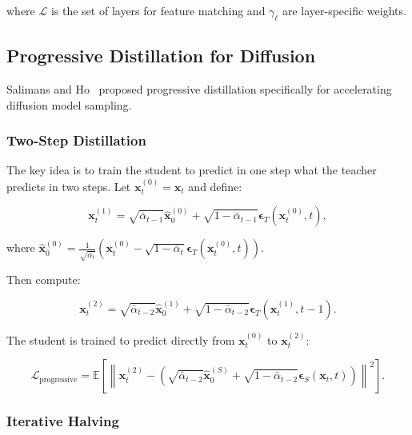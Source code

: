 \documentclass[12pt]{report}
\theoremstyle{definition}
\newcommand{\E}{\mathbb{E}}
\newcommand{\loss}{\mathcal{L}}
\newcommand{\norm}[1]{\left\| #1 \right\|}
\begin{document}
where $\mathcal{L}$ is the set of layers for feature matching and $\gamma_\ell$ are layer-specific weights.

\subsection{Progressive Distillation for Diffusion}

Salimans and Ho~\citep{salimans2022progressive} proposed progressive distillation specifically for accelerating diffusion model sampling.

\subsubsection{Two-Step Distillation}

The key idea is to train the student to predict in one step what the teacher predicts in two steps. Let $\mathbf{x}_t^{(0)} = \mathbf{x}_t$ and define:

\begin{equation}
\mathbf{x}_t^{(1)} = \sqrt{\bar{\alpha}_{t-1}}\hat{\mathbf{x}}_0^{(0)} + \sqrt{1 - \bar{\alpha}_{t-1}}\boldsymbol{\epsilon}_T(\mathbf{x}_t^{(0)}, t),
\label{eq:x_t_1}
\end{equation}

where $\hat{\mathbf{x}}_0^{(0)} = \frac{1}{\sqrt{\bar{\alpha}_t}}(\mathbf{x}_t^{(0)} - \sqrt{1-\bar{\alpha}_t}\boldsymbol{\epsilon}_T(\mathbf{x}_t^{(0)}, t))$.

Then compute:

\begin{equation}
\mathbf{x}_t^{(2)} = \sqrt{\bar{\alpha}_{t-2}}\hat{\mathbf{x}}_0^{(1)} + \sqrt{1 - \bar{\alpha}_{t-2}}\boldsymbol{\epsilon}_T(\mathbf{x}_t^{(1)}, t-1).
\label{eq:x_t_2}
\end{equation}

The student is trained to predict directly from $\mathbf{x}_t^{(0)}$ to $\mathbf{x}_t^{(2)}$:

\begin{equation}
\loss_{\text{progressive}} = \E\left[\norm{\mathbf{x}_t^{(2)} - \left(\sqrt{\bar{\alpha}_{t-2}}\hat{\mathbf{x}}_0^{(S)} + \sqrt{1 - \bar{\alpha}_{t-2}}\boldsymbol{\epsilon}_S(\mathbf{x}_t, t)\right)}^2\right].
\label{eq:progressive_loss}
\end{equation}

\subsubsection{Iterative Halving}
\end{document}
